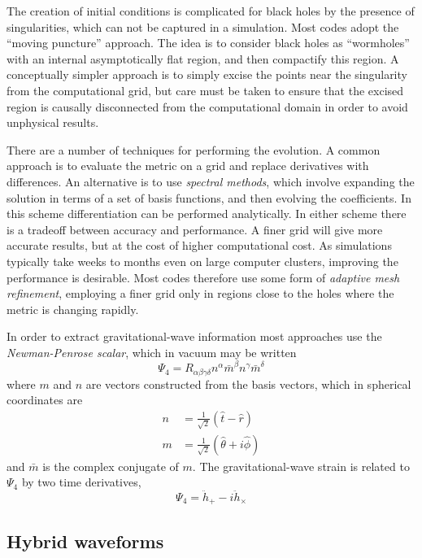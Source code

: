 The creation of initial conditions is complicated for black holes by
the presence of singularities, which can not be captured in a
simulation.  Most codes adopt the ``moving puncture'' approach.  The
idea is to consider black holes as ``wormholes'' with an internal
asymptotically flat region, and then compactify this region.  A
conceptually simpler approach is to simply excise the points near the
singularity from the computational grid, but care must be taken to
ensure that the excised region is causally disconnected from the
computational domain in order to avoid unphysical results.

There are a number of techniques for performing the evolution.  A
common approach is to evaluate the metric on a grid and replace
derivatives with differences.  An alternative is to use \emph{spectral
methods}, which involve expanding the solution in terms of a set of
basis functions, and then evolving the coefficients.  In this scheme
differentiation can be performed analytically.  In either scheme there
is a tradeoff between accuracy and performance.  A finer grid will
give more accurate results, but at the cost of higher computational
cost.  As simulations typically take weeks to months even on large
computer clusters, improving the performance is desirable.  Most codes
therefore use some form of \emph{adaptive mesh refinement}, employing
a finer grid only in regions close to the holes where the metric is
changing rapidly.

In order to extract gravitational-wave information most approaches use
the \emph{Newman-Penrose scalar}, which in vacuum may be written
%
\begin{equation*}
\Psi_4 = R_{\alpha \beta \gamma \delta} n^\alpha \bar{m}^\beta n^\gamma
\bar{m}^\delta
\end{equation*}
%
where $m$ and $n$ are vectors constructed from the basis vectors,
which in spherical coordinates are
%
\begin{align*}
n &= \frac{1}{\sqrt{2}} \left(\hat{t} - \hat{r}\right) \\
m &= \frac{1}{\sqrt{2}} \left(\hat{\theta} +i  \hat{\phi}\right)
\end{align*}
%
and $\bar{m}$ is the complex conjugate of $m$. The gravitational-wave
strain is related to $\Psi_4$ by two time derivatives,
%
\begin{equation*}
\Psi_4 = \ddot{h}_+ - i \ddot{h}_\times
\end{equation*}


\subsection{Hybrid waveforms}
\label{sec:HybridWaveforms}

